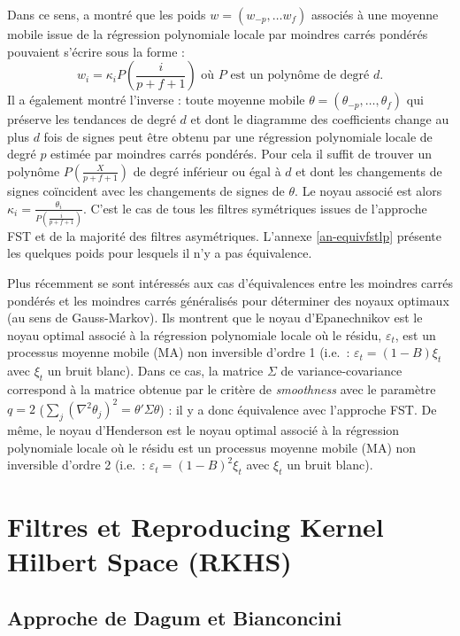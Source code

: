 \documentclass[
  11pt,
  french,
  a4paper]{article}
\newcommand\1{\mathds{1}}
\begin{document}
Dans ce sens, \textcite{henderson1916note} a montré que les poids \(w=(w_{-p},\dots w_{f})\) associés à une moyenne mobile issue de la régression polynomiale locale par moindres carrés pondérés pouvaient s'écrire sous la forme :
\[
w_i = \kappa_i P\left(\frac{i}{p+f+1}\right)\text{ où }P\text{ est un polynôme de degré }d.
\]
Il a également montré l'inverse : toute moyenne mobile \(\theta=(\theta_{-p},\dots, \theta_{f})\) qui préserve les tendances de degré \(d\) et dont le diagramme des coefficients change au plus \(d\) fois de signes peut être obtenu par une régression polynomiale locale de degré \(p\) estimée par moindres carrés pondérés.
Pour cela il suffit de trouver un polynôme \(P\left(\frac{X}{p+f+1}\right)\) de degré inférieur ou égal à \(d\) et dont les changements de signes coïncident avec les changements de signes de \(\theta\).
Le noyau associé est alors \(\kappa_i=\frac{ \theta_i}{P\left(\frac{i}{p+f+1}\right)}\).
C'est le cas de tous les filtres symétriques issues de l'approche FST et de la majorité des filtres asymétriques.
L'annexe \ref{an-equivfstlp} présente les quelques poids pour lesquels il n'y a pas équivalence.

Plus récemment \textcite{LuatiProietti2011} se sont intéressés aux cas d'équivalences entre les moindres carrés pondérés et les moindres carrés généralisés pour déterminer des noyaux optimaux (au sens de Gauss-Markov).
Ils montrent que le noyau d'Epanechnikov est le noyau optimal associé à la régression polynomiale locale où le résidu, \(\varepsilon_t\), est un processus moyenne mobile (MA) non inversible d'ordre 1 (i.e.~: \(\varepsilon_t=(1-B)\xi_t\) avec \(\xi_t\) un bruit blanc).
Dans ce cas, la matrice \(\Sigma\) de variance-covariance correspond à la matrice obtenue par le critère de \emph{smoothness} avec le paramètre \(q=2\) (\(\sum_{j}(\nabla^{2}\theta_{j})^{2} = \theta'\Sigma\theta\)) : il y a donc équivalence avec l'approche FST.
De même, le noyau d'Henderson est le noyau optimal associé à la régression polynomiale locale où le résidu est un processus moyenne mobile (MA) non inversible d'ordre 2 (i.e.~: \(\varepsilon_t=(1-B)^2\xi_t\) avec \(\xi_t\) un bruit blanc).

\hypertarget{sec-rkhs}{%
\section{Filtres et Reproducing Kernel Hilbert Space (RKHS)}\label{sec-rkhs}}

\hypertarget{approche-de-dagum-et-bianconcini}{%
\subsection{Approche de Dagum et Bianconcini}\label{approche-de-dagum-et-bianconcini}}
\end{document}
